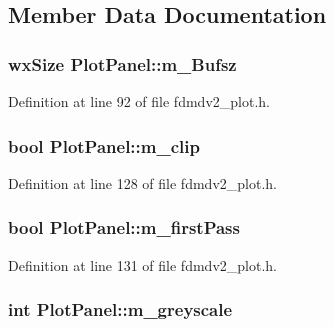 \subsection{Member Data Documentation}
\hypertarget{class_plot_panel_a61a49a35721e334b959e833464add15f}{
\subsubsection[{m\-\_\-\-Bufsz}]{\setlength{\rightskip}{0pt plus 5cm}wx\-Size Plot\-Panel\-::m\-\_\-\-Bufsz}}\label{class_plot_panel_a61a49a35721e334b959e833464add15f}


Definition at line 92 of file fdmdv2\-\_\-plot.\-h.

\hypertarget{class_plot_panel_a07334de87de07eeab43eabbdaf730ab5}{
\subsubsection[{m\-\_\-clip}]{\setlength{\rightskip}{0pt plus 5cm}bool Plot\-Panel\-::m\-\_\-clip\hspace{0.3cm}{\ttfamily [protected]}}}\label{class_plot_panel_a07334de87de07eeab43eabbdaf730ab5}


Definition at line 128 of file fdmdv2\-\_\-plot.\-h.

\hypertarget{class_plot_panel_a1bb0714da68ee75a51a4ebb9e9ea3cad}{
\subsubsection[{m\-\_\-first\-Pass}]{\setlength{\rightskip}{0pt plus 5cm}bool Plot\-Panel\-::m\-\_\-first\-Pass\hspace{0.3cm}{\ttfamily [protected]}}}\label{class_plot_panel_a1bb0714da68ee75a51a4ebb9e9ea3cad}


Definition at line 131 of file fdmdv2\-\_\-plot.\-h.

\hypertarget{class_plot_panel_ab5bc0c62a2dcfccb9e0d9663d7983e3f}{
\subsubsection[{m\-\_\-greyscale}]{\setlength{\rightskip}{0pt plus 5cm}int Plot\-Panel\-::m\-\_\-greyscale\hspace{0.3cm}{\ttfamily [protected]}}}\label{class_plot_panel_ab5bc0c62a2dcfccb9e0d9663d7983e3f}


